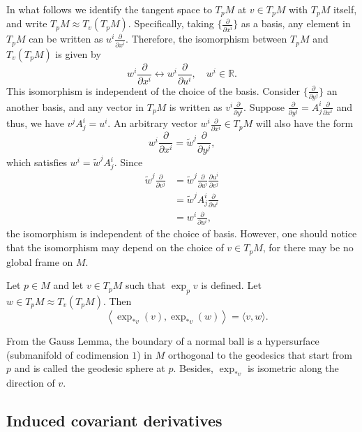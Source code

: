 \documentclass{ctexart}
\begin{document}
In what follows we identify the tangent space to $T_p M$ at $v \in T_p M$ with $T_p M$ itself, and write $T_p M \approx T_v\left(T_p M\right)$. 
Specifically, taking $\{\frac{\partial}{\partial x^i}\}$ as a basis, any element in $T_pM$ can be written as $u^i\frac{\partial}{\partial x^i}$. Therefore, 
the isomorphism between $T_pM$ and $T_v\left(T_pM\right)$ is given by 
$$
w^i\frac{\partial}{\partial x^i}\longleftrightarrow w^i\frac{\partial}{\partial u^i}, \quad w^i\in\mathbb{R}.
$$
This isomorphism is independent of the choice of the basis. Consider $\{\frac{\partial}{\partial y^j}\}$ an another basis, and any vector in $T_pM$ is written as 
$v^i\frac{\partial}{\partial y^i}$. Suppose $\frac{\partial}{\partial y^j}=A_j^i\frac{\partial}{\partial x^i}$ and thus, we have $v^jA_j^i=u^i$.
An arbitrary vector $w^i\frac{\partial}{\partial x^i}\in T_pM$ will also have the form
$$
w^i\frac{\partial}{\partial x^i}=\tilde{w}^j\frac{\partial}{\partial y^j},
$$
which satisfies $w^i=\tilde{w}^jA_j^i$.
Since 
\begin{align*}
  \tilde{w}^j\frac{\partial}{\partial v^j}
  &= \tilde{w}^j \frac{\partial}{\partial u^i} \frac{\partial u^i}{\partial v^j} \\
  &= \tilde{w}^j A_j^i \frac{\partial}{\partial u^i} \\
  &= w^i \frac{\partial}{\partial u^i},
\end{align*}
the isomorphism is independent of the choice of basis. However, one should notice that the isomorphism may depend on the choice of $v\in T_pM$, for 
there may be no global frame on $M$.

\begin{lemma}
    Let $p \in M$ and let $v \in T_p M$ such that $\exp _p v$ is defined. Let $w \in T_p M \approx T_v\left(T_p M\right)$. Then
    $$
    \quad\left\langle\exp_{*v}(v),\exp_{*v}(w)\right\rangle=\langle v, w\rangle.
    $$
\end{lemma}
From the Gauss Lemma, the boundary of a normal ball is a hypersurface (submanifold of codimension $1$) in $M$ 
orthogonal to the geodesics that start from $p$ and is called the geodesic sphere at $p$. Besides, $\exp_{*v}$ is isometric along the direction of $v$. 

\subsection*{Induced covariant derivatives}
\end{document}
